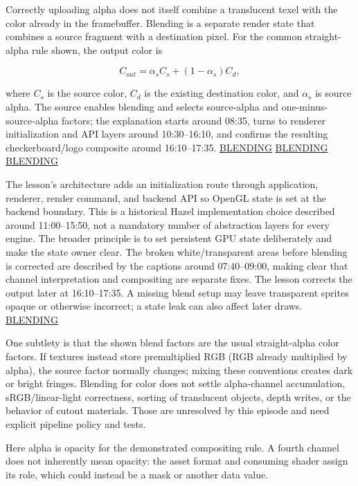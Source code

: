 Correctly uploading alpha does not itself combine a translucent texel with the color already in the framebuffer. Blending is a separate render state that combines a source fragment with a destination pixel. For the common straight-alpha rule shown, the output color is

\[C_{out}=\alpha_s C_s+(1-\alpha_s)C_d,\]

where \(C_s\) is the source color, \(C_d\) is the existing destination color, and \(\alpha_s\) is source alpha. The source enables blending and selects source-alpha and one-minus-source-alpha factors; the explanation starts around 08:35, turns to renderer initialization and API layers around 10:30--16:10, and confirms the resulting checkerboard/logo composite around 16:10--17:35. \href{https://www.youtube.com/watch?v=N94fHNZEHas&t=515s}{BLENDING} \href{https://www.youtube.com/watch?v=N94fHNZEHas&t=630s}{BLENDING} \href{https://www.youtube.com/watch?v=N94fHNZEHas&t=970s}{BLENDING}

The lesson's architecture adds an initialization route through application, renderer, render command, and backend API so OpenGL state is set at the backend boundary. This is a historical Hazel implementation choice described around 11:00--15:50, not a mandatory number of abstraction layers for every engine. The broader principle is to set persistent GPU state deliberately and make the state owner clear. The broken white/transparent areas before blending is corrected are described by the captions around 07:40--09:00, making clear that channel interpretation and compositing are separate fixes. The lesson corrects the output later at 16:10--17:35. A missing blend setup may leave transparent sprites opaque or otherwise incorrect; a state leak can also affect later draws. \href{https://www.youtube.com/watch?v=N94fHNZEHas&t=460s}{BLENDING}

One subtlety is that the shown blend factors are the usual straight-alpha color factors. If textures instead store premultiplied RGB (RGB already multiplied by alpha), the source factor normally changes; mixing these conventions creates dark or bright fringes. Blending for color does not settle alpha-channel accumulation, sRGB/linear-light correctness, sorting of translucent objects, depth writes, or the behavior of cutout materials. Those are unresolved by this episode and need explicit pipeline policy and tests.

Here alpha is opacity for the demonstrated compositing rule. A fourth channel does not inherently mean opacity: the asset format and consuming shader assign its role, which could instead be a mask or another data value.

